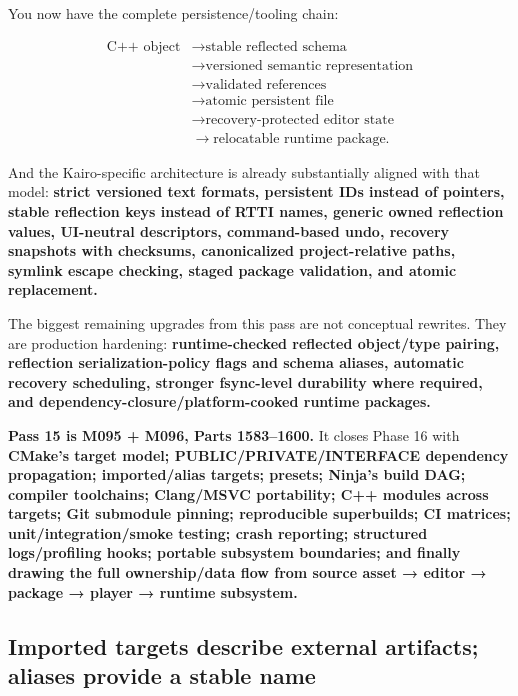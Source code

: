 You now have the complete persistence/tooling chain:

\[
\boxed{
\begin{aligned}
\text{C++ object}
&\rightarrow
\text{stable reflected schema}
\\
&\rightarrow
\text{versioned semantic representation}
\\
&\rightarrow
\text{validated references}
\\
&\rightarrow
\text{atomic persistent file}
\\
&\rightarrow
\text{recovery-protected editor state}
\\
&\rightarrow
\text{relocatable runtime package}.
\end{aligned}
}
\]

And the Kairo-specific architecture is already substantially aligned with that model: \textbf{strict versioned text formats, persistent IDs instead of pointers, stable reflection keys instead of RTTI names, generic owned reflection values, UI-neutral descriptors, command-based undo, recovery snapshots with checksums, canonicalized project-relative paths, symlink escape checking, staged package validation, and atomic replacement.}

The biggest remaining upgrades from this pass are not conceptual rewrites. They are production hardening: \textbf{runtime-checked reflected object/type pairing, reflection serialization-policy flags and schema aliases, automatic recovery scheduling, stronger fsync-level durability where required, and dependency-closure/platform-cooked runtime packages.}

\textbf{Pass 15 is M095 + M096, Parts 1583--1600.} It closes Phase 16 with \textbf{CMake's target model; PUBLIC/PRIVATE/INTERFACE dependency propagation; imported/alias targets; presets; Ninja's build DAG; compiler toolchains; Clang/MSVC portability; C++ modules across targets; Git submodule pinning; reproducible superbuilds; CI matrices; unit/integration/smoke testing; crash reporting; structured logs/profiling hooks; portable subsystem boundaries; and finally drawing the full ownership/data flow from source asset → editor → package → player → runtime subsystem.}

\subsection{Imported targets describe external artifacts; aliases provide a stable name}\label{05-engine-i-ch012-imported-targets-describe-external-artifacts-aliases-provide-a-stable-name}

